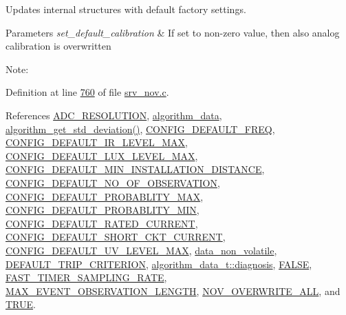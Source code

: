 Updates internal structures with default factory settings. 


\begin{DoxyParams}{Parameters}
{\em set\+\_\+default\+\_\+calibration} & If set to non-\/zero value, then also analog calibration is overwritten\\
\hline
\end{DoxyParams}
Note\+: 

Definition at line \hyperlink{a00060_source_l00760}{760} of file \hyperlink{a00060_source}{srv\+\_\+nov.\+c}.



References \hyperlink{a00058_source_l00016}{A\+D\+C\+\_\+\+R\+E\+S\+O\+L\+U\+T\+I\+O\+N}, \hyperlink{a00038_source_l00033}{algorithm\+\_\+data}, \hyperlink{a00038_source_l00096}{algorithm\+\_\+get\+\_\+std\+\_\+deviation()}, \hyperlink{a00021_source_l00078}{C\+O\+N\+F\+I\+G\+\_\+\+D\+E\+F\+A\+U\+L\+T\+\_\+\+F\+R\+E\+Q}, \hyperlink{a00021_source_l00083}{C\+O\+N\+F\+I\+G\+\_\+\+D\+E\+F\+A\+U\+L\+T\+\_\+\+I\+R\+\_\+\+L\+E\+V\+E\+L\+\_\+\+M\+A\+X}, \hyperlink{a00021_source_l00085}{C\+O\+N\+F\+I\+G\+\_\+\+D\+E\+F\+A\+U\+L\+T\+\_\+\+L\+U\+X\+\_\+\+L\+E\+V\+E\+L\+\_\+\+M\+A\+X}, \hyperlink{a00021_source_l00081}{C\+O\+N\+F\+I\+G\+\_\+\+D\+E\+F\+A\+U\+L\+T\+\_\+\+M\+I\+N\+\_\+\+I\+N\+S\+T\+A\+L\+L\+A\+T\+I\+O\+N\+\_\+\+D\+I\+S\+T\+A\+N\+C\+E}, \hyperlink{a00021_source_l00088}{C\+O\+N\+F\+I\+G\+\_\+\+D\+E\+F\+A\+U\+L\+T\+\_\+\+N\+O\+\_\+\+O\+F\+\_\+\+O\+B\+S\+E\+R\+V\+A\+T\+I\+O\+N}, \hyperlink{a00021_source_l00086}{C\+O\+N\+F\+I\+G\+\_\+\+D\+E\+F\+A\+U\+L\+T\+\_\+\+P\+R\+O\+B\+A\+B\+L\+I\+T\+Y\+\_\+\+M\+A\+X}, \hyperlink{a00021_source_l00087}{C\+O\+N\+F\+I\+G\+\_\+\+D\+E\+F\+A\+U\+L\+T\+\_\+\+P\+R\+O\+B\+A\+B\+L\+I\+T\+Y\+\_\+\+M\+I\+N}, \hyperlink{a00021_source_l00079}{C\+O\+N\+F\+I\+G\+\_\+\+D\+E\+F\+A\+U\+L\+T\+\_\+\+R\+A\+T\+E\+D\+\_\+\+C\+U\+R\+R\+E\+N\+T}, \hyperlink{a00021_source_l00080}{C\+O\+N\+F\+I\+G\+\_\+\+D\+E\+F\+A\+U\+L\+T\+\_\+\+S\+H\+O\+R\+T\+\_\+\+C\+K\+T\+\_\+\+C\+U\+R\+R\+E\+N\+T}, \hyperlink{a00021_source_l00084}{C\+O\+N\+F\+I\+G\+\_\+\+D\+E\+F\+A\+U\+L\+T\+\_\+\+U\+V\+\_\+\+L\+E\+V\+E\+L\+\_\+\+M\+A\+X}, \hyperlink{a00060_source_l00016}{data\+\_\+non\+\_\+volatile}, \hyperlink{a00022_source_l00076}{D\+E\+F\+A\+U\+L\+T\+\_\+\+T\+R\+I\+P\+\_\+\+C\+R\+I\+T\+E\+R\+I\+O\+N}, \hyperlink{a00016_a16f85d57ec98b4ad05f5a2e10536b3c6}{algorithm\+\_\+data\+\_\+t\+::diagnosis}, \hyperlink{a00040_source_l00086}{F\+A\+L\+S\+E}, \hyperlink{a00021_source_l00098}{F\+A\+S\+T\+\_\+\+T\+I\+M\+E\+R\+\_\+\+S\+A\+M\+P\+L\+I\+N\+G\+\_\+\+R\+A\+T\+E}, \hyperlink{a00022_source_l00016}{M\+A\+X\+\_\+\+E\+V\+E\+N\+T\+\_\+\+O\+B\+S\+E\+R\+V\+A\+T\+I\+O\+N\+\_\+\+L\+E\+N\+G\+T\+H}, \hyperlink{a00029_source_l00019}{N\+O\+V\+\_\+\+O\+V\+E\+R\+W\+R\+I\+T\+E\+\_\+\+A\+L\+L}, and \hyperlink{a00040_source_l00084}{T\+R\+U\+E}.


